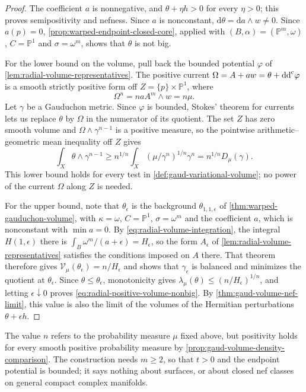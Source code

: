 \begin{proof}
The coefficient $a$ is nonnegative, and $\theta+\eta h>0$ for every $\eta>0$; this proves semipositivity and nefness. Since $a$ is nonconstant, $\mathrm{d}\theta=\mathrm{d}a\wedge w\ne0$. Since $a(p)=0$, \cref{prop:warped-endpoint-closed-core}, applied with $(B,\alpha)=(\mathbb P^m,\omega)$, $C=\mathbb P^1$ and $\sigma=\omega^m$, shows that $\theta$ is not big.

For the lower bound on the volume, pull back the bounded potential $\varphi$ of \cref{lem:radial-volume-representatives}. The positive current $\Omega=A+a w=\theta+\mathrm{dd}^{\mathrm{c}}\varphi$ is a smooth strictly positive form off $Z=\{p\}\times\mathbb P^1$, where
\[
 \Omega^n=n a A^m\wedge w=n\mu.
\]
Let $\gamma$ be a Gauduchon metric. Since $\varphi$ is bounded, Stokes' theorem for currents lets us replace $\theta$ by $\Omega$ in the numerator of its quotient. The set $Z$ has zero smooth volume and $\Omega\wedge\gamma^{n-1}$ is a positive measure, so the pointwise arithmetic--geometric mean inequality off $Z$ gives
\[
 \int_X\theta\wedge\gamma^{n-1}
 \geq n^{1/n}\int_X
            (\mu/\gamma^n)^{1/n}\gamma^n
 =n^{1/n}D_\mu(\gamma).
\]
This lower bound holds for every test in \cref{def:gaud-variational-volume}; no power of the current $\Omega$ along $Z$ is needed.

For the upper bound, note that $\theta_\epsilon$ is the background $\theta_{1,1,\epsilon}$ of \cref{thm:warped-gauduchon-volume}, with $\kappa=\omega$, $C=\mathbb P^1$, $\sigma=\omega^m$ and the coefficient $a$, which is nonconstant with $\min a=0$. By \eqref{eq:radial-volume-integration}, the integral $H(1,\epsilon)$ there is $\int_B\omega^m/(a+\epsilon)=H_\epsilon$, so the form $A_\epsilon$ of \cref{lem:radial-volume-representatives} satisfies the conditions imposed on $A$ there. That theorem therefore gives $\mathcal V_\mu(\theta_\epsilon)=n/H_\epsilon$ and shows that $\gamma_\epsilon$ is balanced and minimizes the quotient at $\theta_\epsilon$. Since $\theta\leq\theta_\epsilon$, monotonicity gives $\lambda_\mu(\theta)\leq(n/H_\epsilon)^{1/n}$, and letting $\epsilon\downarrow0$ proves \eqref{eq:radial-positive-volume-nonbig}. By \cref{thm:gaud-volume-nef-limit}, this value is also the limit of the volumes of the Hermitian perturbations $\theta+\epsilon h$.
\end{proof}

The value $n$ refers to the probability measure $\mu$ fixed above, but positivity holds for every smooth positive probability measure by \cref{prop:gaud-volume-density-comparison}. The construction needs $m\geq2$, so that $t>0$ and the endpoint potential is bounded; it says nothing about surfaces, or about closed nef classes on general compact complex manifolds.


